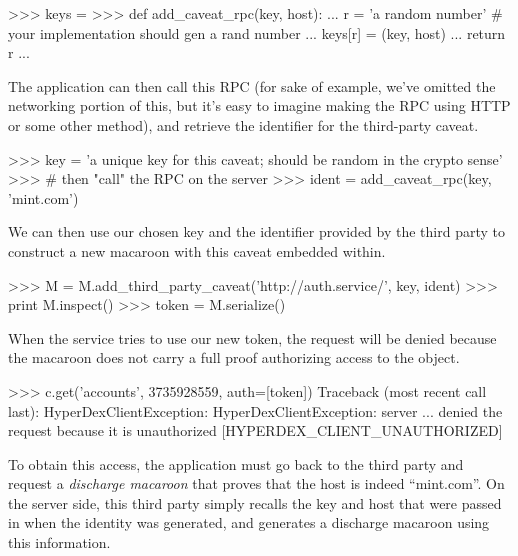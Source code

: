 \begin{pythoncode}
>>> keys = {}
>>> def add_caveat_rpc(key, host):
...     r = 'a random number' # your implementation should gen a rand number
...     keys[r] = (key, host)
...     return r
...
\end{pythoncode}

The application can then call this RPC (for sake of example, we've omitted the
networking portion of this, but it's easy to imagine making the RPC using HTTP
or some other method), and retrieve the identifier for the third-party caveat.

\begin{pythoncode}
>>> key = 'a unique key for this caveat; should be random in the crypto sense'
>>> # then "call" the RPC on the server
>>> ident = add_caveat_rpc(key, 'mint.com')
\end{pythoncode}

We can then use our chosen key and the identifier provided by the third party to
construct a new macaroon with this caveat embedded within.

\begin{pythoncode}
>>> M = M.add_third_party_caveat('http://auth.service/', key, ident)
>>> print M.inspect()
>>> token = M.serialize()
\end{pythoncode}

When the service tries to use our new token, the request will be denied because
the macaroon does not carry a full proof authorizing access to the object.

\begin{pythoncode}
>>> c.get('accounts', 3735928559, auth=[token])
Traceback (most recent call last):
HyperDexClientException: HyperDexClientException: server ... denied the request because it is unauthorized [HYPERDEX_CLIENT_UNAUTHORIZED]
\end{pythoncode}

To obtain this access, the application must go back to the third party and
request a {\em discharge macaroon} that proves that the host is indeed
``mint.com''.  On the server side, this third party simply recalls the key and
host that were passed in when the identity was generated, and generates a
discharge macaroon using this information.

